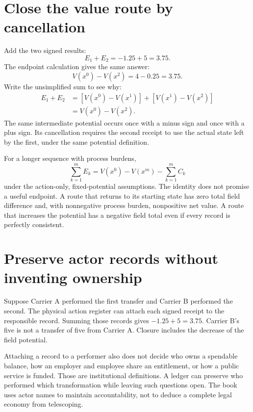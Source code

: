 \section{Close the value route by cancellation}

Add the two signed results:
\begin{equation}
E_1+E_2=-1.25+5=3.75.
\end{equation}
The endpoint calculation gives the same answer:
\begin{equation}
V(x^0)-V(x^2)=4-0.25=3.75.
\end{equation}
Write the unsimplified sum to see why:
\begin{align}
E_1+E_2
&=[V(x^0)-V(x^1)]+[V(x^1)-V(x^2)]\\
&=V(x^0)-V(x^2).
\end{align}
The same intermediate potential occurs once with a minus sign and once with a plus sign. Its cancellation requires the second receipt to use the actual state left by the first, under the same potential definition.

For a longer sequence with process burdens,
\begin{equation}
\sum_{k=1}^{m}E_k=V(x^0)-V(x^m)-\sum_{k=1}^{m}C_k
\end{equation}
under the action-only, fixed-potential assumptions. The identity does not promise a useful endpoint. A route that returns to its starting state has zero total field difference and, with nonnegative process burden, nonpositive net value. A route that increases the potential has a negative field total even if every record is perfectly consistent.

\section{Preserve actor records without inventing ownership}

Suppose Carrier A performed the first transfer and Carrier B performed the second. The physical action register can attach each signed receipt to the responsible record. Summing those records gives \(-1.25+5=3.75\). Carrier B's five is not a transfer of five from Carrier A. Closure includes the decrease of the field potential.

Attaching a record to a performer also does not decide who owns a spendable balance, how an employer and employee share an entitlement, or how a public service is funded. Those are institutional definitions. A ledger can preserve who performed which transformation while leaving such questions open. The book uses actor names to maintain accountability, not to deduce a complete legal economy from telescoping.

